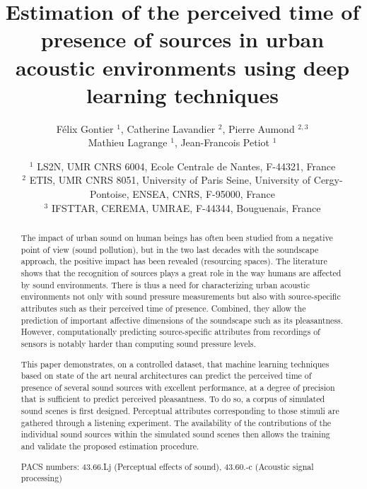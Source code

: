 \documentclass[twocolumn]{article}
\begin{document}
\author{F\'elix Gontier $^1$, Catherine Lavandier $^2$, Pierre Aumond $^{2, 3}$\\Mathieu Lagrange $^1$, Jean-Francois Petiot $^1$}
\date{
$^1$ LS2N, UMR CNRS 6004, Ecole Centrale de Nantes, F-44321, France\\
$^2$ ETIS, UMR CNRS 8051, University of Paris Seine, University of Cergy-Pontoise, ENSEA, CNRS, F-95000, France\\
$^3$ IFSTTAR, CEREMA, UMRAE, F-44344, Bouguenais, France
}
\title{Estimation of the perceived time of presence of sources in urban acoustic environments using deep learning techniques}
\maketitle


\begin{abstract}
The impact of urban sound on human beings has often been studied from a negative point of view (sound pollution), but in the two last decades with the soundscape approach, the positive impact has been revealed (resourcing spaces). The literature shows that the recognition of sources plays a great role in the way humans are affected by sound environments. There is thus a need for characterizing urban acoustic environments not only with sound pressure measurements but also with source-specific attributes such as their perceived time of presence. Combined, they allow the prediction of important affective dimensions of the soundscape such as its pleasantness. However, computationally predicting source-specific attributes from recordings of sensors is notably harder than computing sound pressure levels.

This paper demonstrates, on a controlled dataset, that machine learning techniques based on state of the art neural architectures can predict the perceived time of presence of several sound sources with excellent performance, at a degree of precision that is sufficient to predict perceived pleasantness. To do so, a corpus of simulated sound scenes is first designed. Perceptual attributes corresponding to those stimuli are gathered through a listening experiment. The availability of the contributions of the individual sound sources within the simulated sound scenes then allows the training and validate the proposed estimation procedure.

PACS numbers: 43.66.Lj (Perceptual effects of sound), 43.60.-c (Acoustic signal processing)
\end{abstract}
\end{document}
